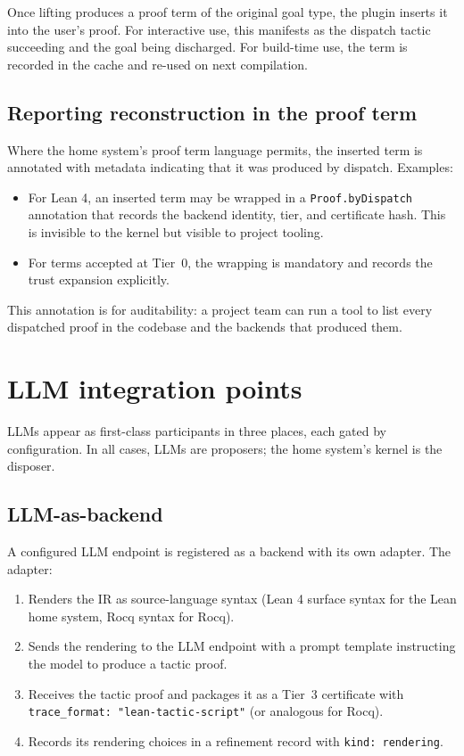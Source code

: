 \documentclass[11pt,letterpaper]{article}
\theoremstyle{definition}
\theoremstyle{remark}
\begin{document}
Once lifting produces a proof term of the original goal type, the
plugin inserts it into the user's proof. For interactive use, this
manifests as the dispatch tactic succeeding and the goal being
discharged. For build-time use, the term is recorded in the cache and
re-used on next compilation.

\subsection{Reporting reconstruction in the proof term}

Where the home system's proof term language permits, the inserted term
is annotated with metadata indicating that it was produced by
dispatch. Examples:

\begin{itemize}[leftmargin=2em]
  \item For Lean 4, an inserted term may be wrapped in a
        \texttt{Proof.byDispatch} annotation that records the backend
        identity, tier, and certificate hash. This is invisible to the
        kernel but visible to project tooling.
  \item For terms accepted at Tier~0, the wrapping is mandatory and
        records the trust expansion explicitly.
\end{itemize}

This annotation is for auditability: a project team can run a tool to
list every dispatched proof in the codebase and the backends that
produced them.

\section{LLM integration points}
\label{sec:llm}

LLMs appear as first-class participants in three places, each gated by
configuration. In all cases, LLMs are proposers; the home system's
kernel is the disposer.

\subsection{LLM-as-backend}

A configured LLM endpoint is registered as a backend with its own
adapter. The adapter:

\begin{enumerate}[leftmargin=2em]
  \item Renders the IR as source-language syntax (Lean 4 surface
        syntax for the Lean home system, Rocq syntax for Rocq).
  \item Sends the rendering to the LLM endpoint with a prompt template
        instructing the model to produce a tactic proof.
  \item Receives the tactic proof and packages it as a Tier~3
        certificate with \texttt{trace\_format: "lean-tactic-script"}
        (or analogous for Rocq).
  \item Records its rendering choices in a refinement record with
        \texttt{kind: rendering}.
\end{enumerate}
\end{document}
